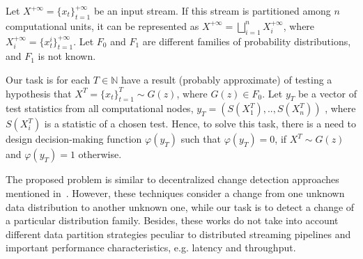 \label {fs-short-model}

Let $X^{+\infty}=\{x_t\}_{t=1}^{+\infty}$ be an input stream. If this stream is partitioned among $n$ computational units, it can be represented as $X^{+\infty}=\bigsqcup_{i=1}^n X_i^{+\infty}$, where $X_i^{+\infty}=\{x_t^i\}_{t=1}^{+\infty}$. Let $F_0$ and $F_1$ are different families of probability distributions, and $F_1$ is not known. 

Our task is for each $T\in \mathbb{N}$ have a result (probably approximate) of testing a hypothesis that $X^T=\{x_t\}_{t=1}^{T} \sim G(z)$, where $G(z) \in F_0$. Let $y_T$ be a vector of test statistics from all computational nodes,  $y_T = (S(X_1^T),..,S(X_n^T))$ , where $S(X_i^T)$ is a statistic of a chosen test. Hence, to solve this task, there is a need to design decision-making function $\varphi(y_T)$ such that $\varphi(y_T) = 0$, if $X^T \sim G(z)$  and $\varphi(y_T) = 1$ otherwise.

The proposed problem is similar to decentralized change detection approaches mentioned in~\cite{tartakovsky2008asymptotically, tran2014change}. However, these techniques consider a change from one unknown data distribution to another unknown one, while our task is to detect a change of a particular distribution family. Besides, these works do not take into account different data partition strategies peculiar to distributed streaming pipelines and important performance characteristics, e.g. latency and throughput.